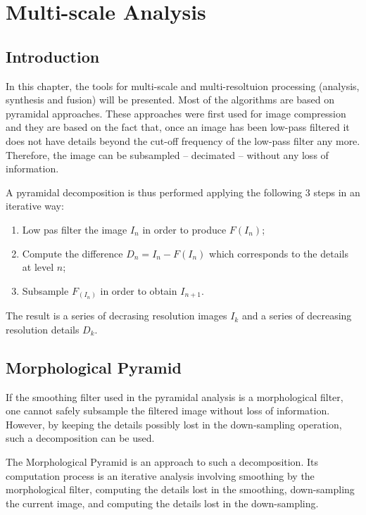 \chapter{Multi-scale Analysis}
\section{Introduction}

In this chapter, the tools for multi-scale and multi-resoltuion
processing (analysis, synthesis and fusion) will be presented. Most of
the algorithms are based on pyramidal approaches. These approaches
were first used for image compression and they are based on the fact
that, once an image has been low-pass filtered it does not have
details beyond the cut-off frequency of the low-pass
filter any more. Therefore, the image can be subsampled -- decimated -- without
any loss of information.

A pyramidal decomposition is thus performed applying the following 3
steps in an iterative way:
\begin{enumerate}
  \item Low pas filter the image $I_{n}$ in order to produce $F(I_n)$;
  \item Compute the difference $D_n = I_n - F(I_n)$ which corresponds
  to the details at level $n$;
  \item Subsample $F_(I_n)$ in order to obtain $I_{n+1}$.
\end{enumerate}

The result is a series of decrasing resolution images $I_k$ and a
series of decreasing resolution details $D_k$.



\section{Morphological Pyramid}\label{secMorphoPyr}

If the smoothing filter used in the pyramidal analysis is a
morphological filter, one cannot safely subsample the filtered image
without loss of information. However, by keeping the details possibly
lost in the down-sampling operation, such a decomposition can be used.

The Morphological Pyramid is an approach to such a
decomposition. Its computation process is an iterative analysis
involving smoothing by the morphological filter, computing the
details lost in the smoothing, down-sampling the current image, and
computing the details lost in the down-sampling.

